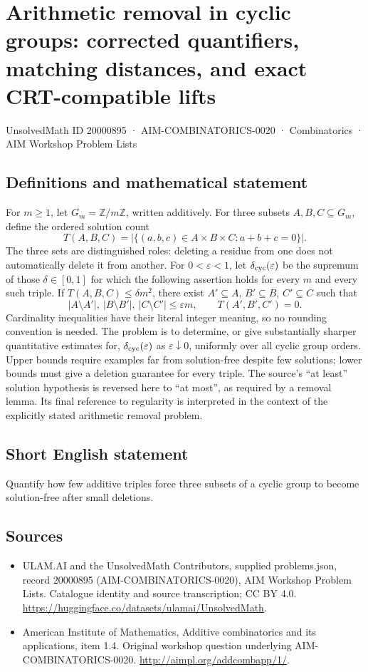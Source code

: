 \documentclass[11pt,a4paper]{article}
\begin{document}
\section*{Arithmetic removal in cyclic groups: corrected quantifiers, matching distances, and exact CRT-compatible lifts}\label{20000895}
{\small UnsolvedMath ID 20000895 · AIM-COMBINATORICS-0020 · Combinatorics · AIM Workshop Problem Lists}
\subsection{Definitions and mathematical statement}
For $m\geq1$, let $G_m=\mathbb Z/m\mathbb Z$, written additively.
For three subsets $A,B,C\subseteq G_m$, define the ordered solution count
\[
 T(A,B,C)=|\{(a,b,c)\in A\times B\times C:a+b+c=0\}|.
\]
The three sets are distinguished roles: deleting a residue from one does not automatically delete it from another.
For $0<\varepsilon<1$, let $\delta_{\rm cyc}(\varepsilon)$ be the supremum of those $\delta\in[0,1]$ for which the following assertion holds for every $m$ and every such triple.
If $T(A,B,C)\leq\delta m^2$, there exist $A'\subseteq A$, $B'\subseteq B$, $C'\subseteq C$ such that
\[
 |A\setminus A'|,\ |B\setminus B'|,\ |C\setminus C'|
 \leq\varepsilon m,
 \qquad T(A',B',C')=0.
\]
Cardinality inequalities have their literal integer meaning, so no rounding convention is needed.
The problem is to determine, or give substantially sharper quantitative estimates for, $\delta_{\rm cyc}(\varepsilon)$ as $\varepsilon\downarrow0$, uniformly over all cyclic group orders.
Upper bounds require examples far from solution-free despite few solutions; lower bounds must give a deletion guarantee for every triple.
The source's ``at least'' solution hypothesis is reversed here to ``at most'', as required by a removal lemma.
Its final reference to regularity is interpreted in the context of the explicitly stated arithmetic removal problem.
\subsection{Short English statement}
Quantify how few additive triples force three subsets of a cyclic group to become solution-free after small deletions.
\subsection{Sources}
\begin{itemize}
\item[S1] ULAM.AI and the UnsolvedMath Contributors, supplied problems.json, record 20000895 (AIM-COMBINATORICS-0020), AIM Workshop Problem Lists. Catalogue identity and source transcription; CC BY 4.0.
\url{https://huggingface.co/datasets/ulamai/UnsolvedMath}.
\item[S2] American Institute of Mathematics, Additive combinatorics and its applications, item 1.4. Original workshop question underlying AIM-COMBINATORICS-0020.
\url{http://aimpl.org/addcombapp/1/}.
\end{itemize}
\end{document}
